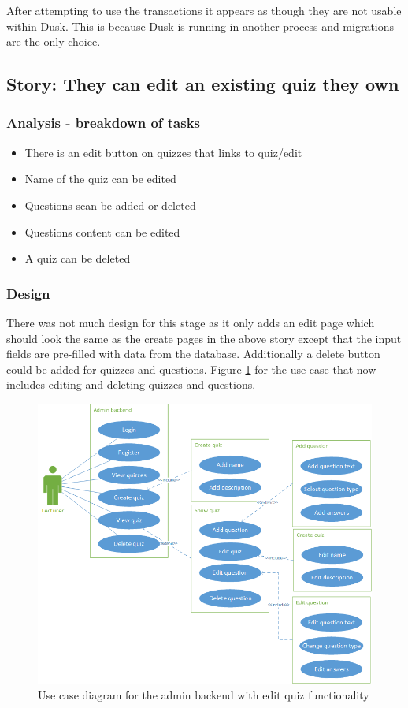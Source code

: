 After attempting to use the transactions it appears as though they are not usable within Dusk. This is because Dusk is running in another process and migrations are the only choice\cite{dusk-transactions}. 
\newpage

\subsection{Story: They can edit an existing quiz they own}
\subsubsection{Analysis - breakdown of tasks}
\begin{itemize}
	\item There is an edit button on quizzes that links to quiz/edit
	\item Name of the quiz can be edited
	\item Questions scan be added or deleted
	\item Questions content can be edited
	\item A quiz can be deleted
\end{itemize}
\subsubsection{Design}
There was not much design for this stage as it only adds an edit page which should look the same as the create pages in the above story except that the input fields are pre-filled with data from the database. Additionally a delete button could be added for quizzes and questions. Figure \ref{fig:quiz-edit-use-case} for the use case that now includes editing and deleting quizzes and questions.
\begin{figure}
	\caption{Use case diagram for the admin backend with edit quiz functionality}
	\centerline{\includegraphics{Chapter2/Iter-2/iter-2-use-case-edit}}
	\label{fig:quiz-edit-use-case}
\end{figure}
